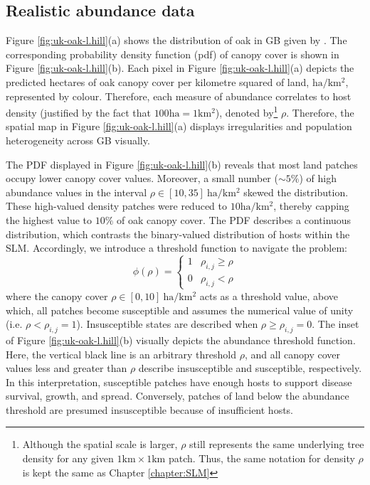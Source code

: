 \newpage

\subsection{Realistic abundance data}

Figure \ref{fig:uk-oak-l.hill}(a) shows the distribution of oak in GB given by \cite{hill.data}.
The corresponding probability density function (\acrshort{pdf}) of canopy cover is shown in Figure \ref{fig:uk-oak-l.hill}(b). Each pixel in Figure \ref{fig:uk-oak-l.hill}(a) depicts the predicted hectares
of oak canopy cover per kilometre squared of land, $\mathrm{ha/km^{2}}$, represented by colour. 
Therefore, each measure of abundance correlates to host density (justified by the fact that $100\mathrm{ha} = 1 \mathrm{km^2}$), denoted by\footnote{Although the spatial scale is larger, $\rho$ still represents the same underlying tree density for any given $1\mathrm{km} \times 1\mathrm{km}$ patch. Thus, the same notation for density $\rho$ is kept the same as Chapter \ref{chapter:SLM}} $\rho$. 
Therefore, the spatial map in Figure \ref{fig:uk-oak-l.hill}(a) displays irregularities and population heterogeneity across GB visually.

The PDF displayed in Figure \ref{fig:uk-oak-l.hill}(b) reveals that most land patches occupy lower canopy cover values. Moreover, a small number ($\sim 5\%$) of high abundance values in the interval $\rho \in [10, 35]\ \mathrm{ha/km^2}$ skewed the distribution. These high-valued density patches were reduced to $10\mathrm{ha/km^2}$, thereby capping the highest value to $10\%$ of oak canopy cover. The PDF describes a continuous distribution, which contrasts the binary-valued distribution of hosts within the SLM. Accordingly, we introduce a threshold function to navigate the problem:  
\begin{equation}
  \phi(\rho) =
  \begin{cases}
    1 & \rho_{i,j}\geq\rho \\
    0 & \rho_{i,j}<\rho
  \end{cases}
\end{equation}
where the canopy cover $\rho\in[0, 10]\ \mathrm{ha/km^{2}}$ acts as a threshold value, above which, all patches become susceptible and assumes the numerical value of unity (i.e. $\rho < \rho_{i,j} = 1$).
Insusceptible states are described when $\rho \geq \rho_{i,j}= 0$. The inset of Figure \ref{fig:uk-oak-l.hill}(b) visually depicts the abundance threshold function. Here, the vertical black line is an arbitrary threshold $\rho$, and all canopy cover values less and greater than $\rho$ describe insusceptible and susceptible, respectively. In this interpretation, susceptible patches have enough hosts to support disease survival, growth, and spread. Conversely, patches of land below the abundance threshold are presumed insusceptible because of insufficient hosts.


